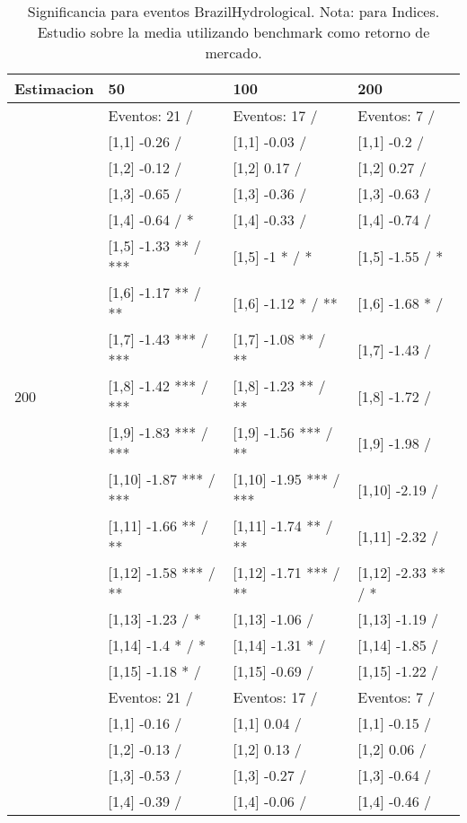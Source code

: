 \begin{table}

\caption{Significancia para eventos BrazilHydrological. Nota: para Indices. Estudio sobre la media utilizando benchmark como retorno de mercado.}
\centering
\begin{tabular}[t]{llll}
\toprule
Estimacion & 50 & 100 & 200\\
\midrule
 & Eventos:  21 / & Eventos:  17 / & Eventos:  7 /\\
 & {}[1,1] -0.26  / & {}[1,1] -0.03  / & {}[1,1] -0.2  /\\
 & {}[1,2] -0.12  / & {}[1,2] 0.17  / & {}[1,2] 0.27  /\\
 & {}[1,3] -0.65  / & {}[1,3] -0.36  / & {}[1,3] -0.63  /\\
 & {}[1,4] -0.64  / * & {}[1,4] -0.33  / & {}[1,4] -0.74  /\\
\addlinespace
 & {}[1,5] -1.33 ** / *** & {}[1,5] -1 * / * & {}[1,5] -1.55  / *\\
 & {}[1,6] -1.17 ** / ** & {}[1,6] -1.12 * / ** & {}[1,6] -1.68 * /\\
 & {}[1,7] -1.43 *** / *** & {}[1,7] -1.08 ** / ** & {}[1,7] -1.43  /\\
200 & {}[1,8] -1.42 *** / *** & {}[1,8] -1.23 ** / ** & {}[1,8] -1.72  /\\
 & {}[1,9] -1.83 *** / *** & {}[1,9] -1.56 *** / ** & {}[1,9] -1.98  /\\
\addlinespace
 & {}[1,10] -1.87 *** / *** & {}[1,10] -1.95 *** / *** & {}[1,10] -2.19  /\\
 & {}[1,11] -1.66 ** / ** & {}[1,11] -1.74 ** / ** & {}[1,11] -2.32  /\\
 & {}[1,12] -1.58 *** / ** & {}[1,12] -1.71 *** / ** & {}[1,12] -2.33 ** / *\\
 & {}[1,13] -1.23  / * & {}[1,13] -1.06  / & {}[1,13] -1.19  /\\
 & {}[1,14] -1.4 * / * & {}[1,14] -1.31 * / & {}[1,14] -1.85  /\\
\addlinespace
 & {}[1,15] -1.18 * / & {}[1,15] -0.69  / & {}[1,15] -1.22  /\\
 & Eventos:  21 / & Eventos:  17 / & Eventos:  7 /\\
 & {}[1,1] -0.16  / & {}[1,1] 0.04  / & {}[1,1] -0.15  /\\
 & {}[1,2] -0.13  / & {}[1,2] 0.13  / & {}[1,2] 0.06  /\\
 & {}[1,3] -0.53  / & {}[1,3] -0.27  / & {}[1,3] -0.64  /\\
\addlinespace
 & {}[1,4] -0.39  / & {}[1,4] -0.06  / & {}[1,4] -0.46  /\\

\end{tabular}
\end{table}

